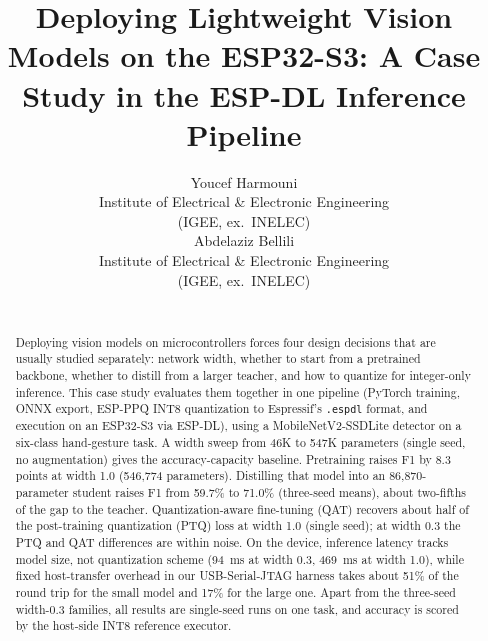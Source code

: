 \documentclass[conference]{IEEEtran}
\begin{document}
	
	\title{Deploying Lightweight Vision Models on the ESP32-S3: A Case Study in the ESP-DL Inference Pipeline}
	
	\author{
		\noindent\begin{minipage}[t]{0.47\textwidth}
			\centering
			{\sublargesize Youcef Harmouni}\\
			{\normalsize Institute of Electrical \& Electronic Engineering}\\
			{\normalsize (IGEE, ex.\ INELEC)}
		\end{minipage}%
		\hfill
		\begin{minipage}[t]{0.47\textwidth}
			\centering
			{\sublargesize Abdelaziz Bellili}\\
			{\normalsize Institute of Electrical \& Electronic Engineering}\\
			{\normalsize (IGEE, ex.\ INELEC)}
		\end{minipage}
		\\[8pt]
	}
	
	\maketitle
	
	\begin{abstract}
		Deploying vision models on microcontrollers forces four design decisions that are usually
		studied separately: network width, whether to start from a pretrained backbone, whether to
		distill from a larger teacher, and how to quantize for integer-only inference. This case study
		evaluates them together in one pipeline (PyTorch training, ONNX export, ESP-PPQ INT8
		quantization to Espressif's \texttt{.espdl} format, and execution on an ESP32-S3 via ESP-DL),
		using a MobileNetV2-SSDLite detector on a six-class hand-gesture task. A width sweep from 46K
		to 547K parameters (single seed, no augmentation) gives the accuracy-capacity baseline.
		Pretraining raises F1 by 8.3 points at width 1.0 (546{,}774
		parameters). Distilling that model into an 86{,}870-parameter student raises F1 from 59.7\% to
		71.0\% (three-seed means), about two-fifths of the gap to the teacher. Quantization-aware
		fine-tuning (QAT) recovers about half of the post-training quantization (PTQ) loss at width 1.0
		(single seed); at width 0.3 the PTQ and QAT differences are within noise. On the device,
		inference latency tracks model size, not quantization scheme (94~ms at width 0.3, 469~ms at
		width 1.0), while fixed host-transfer overhead in our USB-Serial-JTAG harness takes about 51\%
		of the round trip for the small model and 17\% for the large one. Apart from the three-seed
		width-0.3 families, all results are single-seed runs on one task, and accuracy is scored by
		the host-side INT8 reference executor.
	\end{abstract}
	
\end{document}
